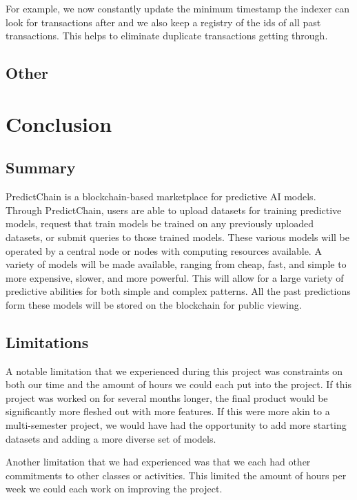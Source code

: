 \documentclass{article}
\begin{document}
    For example, we now constantly update the minimum timestamp the indexer can look for transactions after and we also
    keep a registry of the ids of all past transactions.  This helps to eliminate duplicate transactions getting through.

    \subsection{Other}

    \section{Conclusion}

    \subsection{Summary}

    PredictChain is a blockchain-based marketplace for predictive AI models.
    Through PredictChain, users are able to upload datasets for training predictive models, request that train models
    be trained on any previously uploaded datasets, or submit queries to those trained models.
    These various models will be operated by a central node or nodes with computing resources available. A variety of
    models will be made available, ranging from cheap, fast, and simple to more expensive, slower, and more powerful.
    This will allow for a large variety of predictive abilities for both simple and complex patterns.  All the past predictions
    form these models will be stored on the blockchain for public viewing.

    \subsection{Limitations}

    A notable limitation that we experienced during this project was constraints on both our time and the amount of
    hours we could each put into the project.  If this project was worked on for several months longer, the final product
    would be significantly more fleshed out with more features.  If this were more akin to a multi-semester project,
    we would have had the opportunity to add more starting datasets and adding a more diverse set of models.

    Another limitation that we had experienced was that we each had other commitments to other classes or activities.
    This limited the amount of hours per week we could each work on improving the project.
\end{document}
